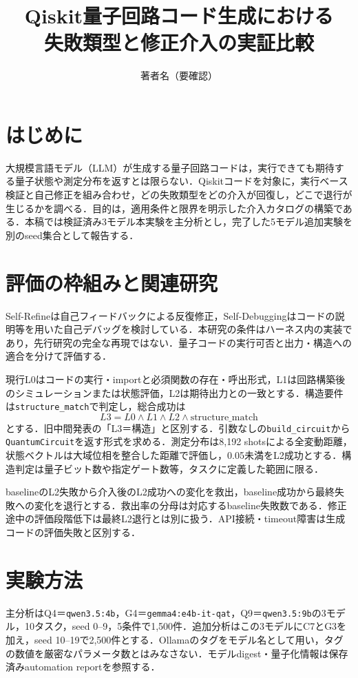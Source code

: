 \documentclass[a4paper,8pt,twocolumn]{extarticle}
\title{Qiskit量子回路コード生成における\\失敗類型と修正介入の実証比較}
\author{著者名（要確認）}
\affiliation{所属（要確認）}
\begin{document}
\maketitle
\thispagestyle{empty}

\section{はじめに}
大規模言語モデル（LLM）が生成する量子回路コードは，実行できても期待する量子状態や測定分布を返すとは限らない．Qiskitコードを対象に，実行ベース検証と自己修正を組み合わせ，どの失敗類型をどの介入が回復し，どこで退行が生じるかを調べる．目的は，適用条件と限界を明示した介入カタログの構築である．本稿では検証済み3モデル本実験を主分析とし，完了した5モデル追加実験を別のseed集合として報告する．

\section{評価の枠組みと関連研究}
Self-Refineは自己フィードバックによる反復修正\cite{selfrefine}，Self-Debuggingはコードの説明等を用いた自己デバッグ\cite{selfdebug}を検討している．本研究の条件はハーネス内の実装であり，先行研究の完全な再現ではない．量子コードの実行可否と出力・構造への適合を分けて評価する．

現行L0はコードの実行・importと必須関数の存在・呼出形式，L1は回路構築後のシミュレーションまたは状態評価，L2は期待出力との一致とする．構造要件は\texttt{structure\_match}で判定し，総合成功は
\begin{equation}
L3=L0\land L1\land L2\land\mathrm{structure\_match}
\end{equation}
とする．旧中間発表の「L3＝構造」と区別する．引数なしの\texttt{build\_circuit}から\texttt{QuantumCircuit}を返す形式を求める．測定分布は8,192 shotsによる全変動距離，状態ベクトルは大域位相を整合した距離で評価し，0.05未満をL2成功とする．構造判定は量子ビット数や指定ゲート数等，タスクに定義した範囲に限る．

baselineのL2失敗から介入後のL2成功への変化を救出，baseline成功から最終失敗への変化を退行とする．救出率の分母は対応するbaseline失敗数である．修正途中の評価段階低下は最終L2退行とは別に扱う．API接続・timeout障害は生成コードの評価失敗と区別する．

\section{実験方法}
主分析はQ4＝\texttt{qwen3.5:4b}，G4＝\texttt{gemma4:e4b-it-qat}，Q9＝\texttt{qwen3.5:9b}の3モデル，10タスク，seed 0--9，5条件で1,500件．追加分析はこの3モデルにC7とG3を加え，seed 10--19で2,500件とする．Ollamaのタグをモデル名として用い，タグの数値を厳密なパラメータ数とはみなさない．モデルdigest・量子化情報は保存済みautomation reportを参照する．
\end{document}
